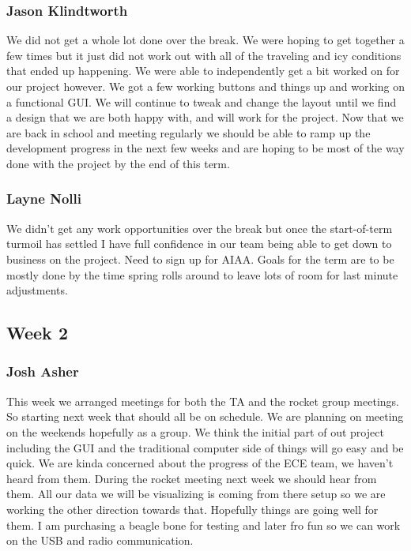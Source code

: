 \documentclass[10pt,draftclsnofoot,onecolumn]{IEEEtran}
\begin{document}
\subsubsection{Jason Klindtworth} 
We did not get a whole lot done over the break. We were hoping to get together a few times but it just did not work out with all of the traveling and icy conditions that ended up happening. We were able to independently get a bit worked on for our project however. We got a few working buttons and things up and working on a functional GUI. We will continue to tweak and change the layout until we find a design that we are both happy with, and will work for the project. Now that we are back in school and meeting regularly we should be able to ramp up the development progress in the next few weeks and are hoping to be most of the way done with the project by the end of this term. \par

\subsubsection{Layne Nolli}
We didn't get any work opportunities over the break but once the start-of-term turmoil has settled I have full confidence in our team being able to get down to business on the project. Need to sign up for AIAA. Goals for the term are to be mostly done by the time spring rolls around to leave lots of room for last minute adjustments. \par

\subsection{Week 2}

\subsubsection{Josh Asher}
This week we arranged meetings for both the TA and the rocket group meetings. So starting next week that should all be on schedule. We are planning on meeting on the weekends hopefully as a group. We think the initial part of out project including the GUI and the traditional computer side of things will go easy and be quick. We are kinda concerned about the progress of the ECE team, we haven't heard from them. During the rocket meeting next week we should hear from them. All our data we will be visualizing is coming from there setup so we are working the other direction towards that. Hopefully things are going well for them. I am purchasing a beagle bone for testing and later fro fun so we can work on the USB and radio communication. \par
\end{document}
